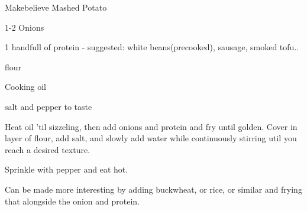 \begin{recipe}{Makebelieve Mashed Potato}
  \begin{ingr}[1-2]
  \item 1-2 Onions
  \item 1 handfull of protein - suggested: white beans(precooked),
    sausage, smoked tofu..
  \item flour
  \item Cooking oil
  \item salt and pepper to taste
  \end{ingr}
 
Heat oil 'til sizzeling, then add onions and protein and fry until golden.
  Cover in layer of flour, add salt, and slowly add water while
  continuously stirring util
  you reach a desired texture.

  Sprinkle with pepper and eat hot.

  Can be made more interesting by adding buckwheat, or rice, or
  similar and frying
  that alongside the onion and protein.
\end{recipe}
